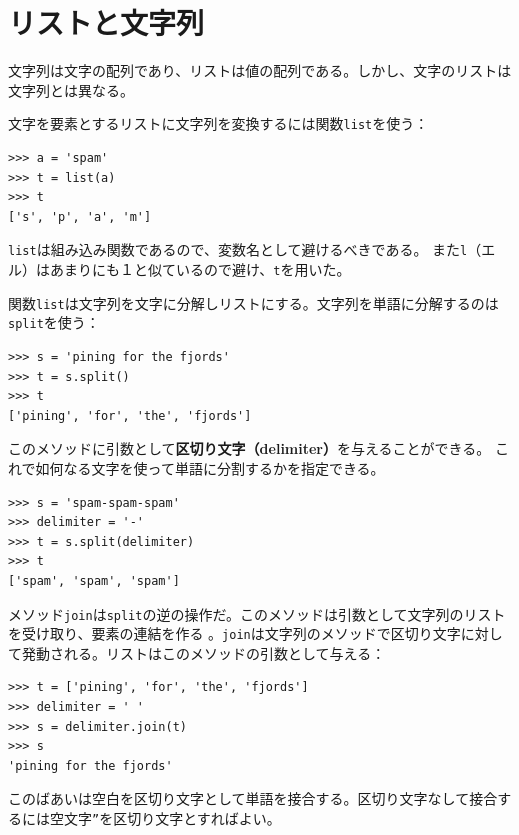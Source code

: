 \documentclass[a4j,12pt,makeidx]{jbook}
\begin{document}
\section{リストと文字列}
文字列は文字の配列であり、リストは値の配列である。しかし、文字のリストは文字列とは異なる。\par
文字を要素とするリストに文字列を変換するには関数{\tt list}を使う：
\begin{verbatim}
>>> a = 'spam'
>>> t = list(a)
>>> t
['s', 'p', 'a', 'm']
\end{verbatim}
{\tt list}は組み込み関数であるので、変数名として避けるべきである。
また{\tt l}（エル）はあまりにも１と似ているので避け、{\tt t}を用いた。 \par
関数{\tt list}は文字列を文字に分解しリストにする。文字列を単語に分解するのは{\tt split}を使う：
\begin{verbatim}
>>> s = 'pining for the fjords'
>>> t = s.split()
>>> t
['pining', 'for', 'the', 'fjords']
\end{verbatim}
このメソッドに引数として{\bf 区切り文字（delimiter）}を与えることができる。
これで如何なる文字を使って単語に分割するかを指定できる。
\begin{verbatim}
>>> s = 'spam-spam-spam'
>>> delimiter = '-'
>>> t = s.split(delimiter)
>>> t
['spam', 'spam', 'spam']
\end{verbatim} \par
メソッド{\tt join}は{\tt split}の逆の操作だ。このメソッドは引数として文字列のリストを受け取り、要素の連結を作る
。{\tt join}は文字列のメソッドで区切り文字に対して発動される。リストはこのメソッドの引数として与える：
\begin{verbatim}
>>> t = ['pining', 'for', 'the', 'fjords']
>>> delimiter = ' '
>>> s = delimiter.join(t)
>>> s
'pining for the fjords'
\end{verbatim}
このばあいは空白を区切り文字として単語を接合する。区切り文字なして接合するには空文字{\tt ''}を区切り文字とすればよい。
%
\end{document}
